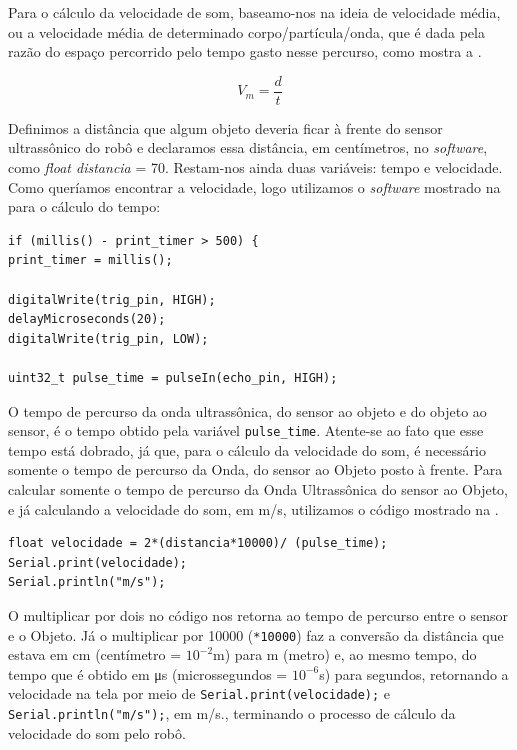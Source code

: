 \documentclass{textolivre}
\begin{document}
Para o cálculo da velocidade de som, baseamo-nos na ideia de velocidade média, ou a velocidade média de determinado corpo/partícula/onda, que é dada pela razão do espaço percorrido pelo tempo gasto nesse percurso, como mostra a . 

\begin{equation}\label{eq01}
V_m = \frac{d}{t}
\end{equation}

Definimos a distância que algum objeto deveria ficar à frente do sensor ultrassônico do robô e declaramos essa distância, em centímetros, no \emph{software}, como \emph{float distancia} = 70. Restam-nos ainda duas variáveis: tempo e velocidade. Como queríamos encontrar a velocidade, logo utilizamos o \emph{software} mostrado na  para o cálculo do tempo:

\begin{lstlisting}[label=lst02, caption={Calculando o tempo de percurso da Onda Ultrassônica.}, source={Arquivo pessoal.}]
if (millis() - print_timer > 500) {
print_timer = millis();
 
digitalWrite(trig_pin, HIGH);
delayMicroseconds(20);
digitalWrite(trig_pin, LOW);
 
uint32_t pulse_time = pulseIn(echo_pin, HIGH);
\end{lstlisting} %


O tempo de percurso da onda ultrassônica, do sensor ao objeto e do objeto ao sensor, é o tempo obtido pela variável \lstinline{pulse_time}. Atente-se ao fato que esse tempo está dobrado, já que, para o cálculo da velocidade do som, é necessário somente o tempo de percurso da Onda, do sensor ao Objeto posto à frente. Para calcular somente o tempo de percurso da Onda Ultrassônica do sensor ao Objeto, e já calculando a velocidade do som, em m/s, utilizamos o código mostrado na .

\begin{lstlisting}[label=lst03, caption={Calculando a Velocidade do Som no Ambiente em que se encontra o Robô.}, source={Arquivo pessoal.}]
float velocidade = 2*(distancia*10000)/ (pulse_time);
Serial.print(velocidade);
Serial.println("m/s");
\end{lstlisting} %

O multiplicar por dois no código nos retorna ao tempo de percurso entre o sensor e o Objeto. Já o multiplicar por 10000 (\lstinline{*10000}) faz a conversão da distância que estava em cm (centímetro = $10^{-2}$m) para m (metro) e, ao mesmo tempo, do tempo que é obtido em μs (microssegundos = $10^{-6}$s) para segundos, retornando a velocidade na tela por meio de \lstinline{Serial.print(velocidade);} e \lstinline{Serial.println("m/s");}, em m/s., terminando o processo de cálculo da velocidade do som pelo robô.
\end{document}
